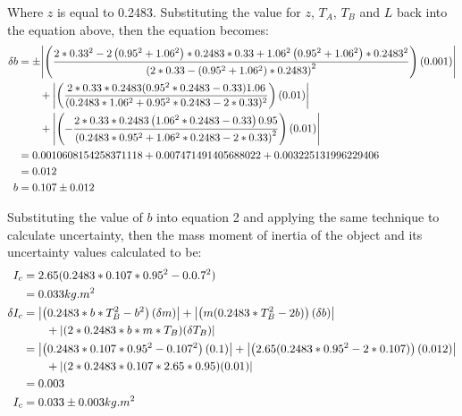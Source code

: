 Where $z$ is equal to 0.2483. Substituting the value for $z$, $T_A$, $T_B$ and $L$ back into the equation above, then the equation becomes: \\
\begin{align}
\delta b &= \pm \abs{\left(\dfrac{2*0.33^2-2\left(0.95^2+1.06^2\right)*0.2483*0.33+1.06^2\left(0.95^2+1.06^2\right)*0.2483^2}{\left(2*0.33-\left(0.95^2+1.06^2\right)*0.2483\right)^2}\right)(0.001)} \notag \\
&\qquad + \abs{\left(\dfrac{2*0.33*0.2483(0.95^2*0.2483-0.33)1.06}{(0.2483*1.06^2+0.95^2*0.2483-2*0.33)^2}\right)(0.01)} \notag \\ 
&\qquad + \abs{\left(-\dfrac{2*0.33*0.2483\left(1.06^2*0.2483-0.33\right)0.95}{\left(0.2483*0.95^2+1.06^2*0.2483-2*0.33\right)^2}\right)(0.01)} \notag \\
&=  0.0010608154258371118 + 0.007471491405688022 + 0.003225131996229406 \notag \\
&= 0.012 \notag \\
b &= 0.107 \pm 0.012 \notag
\end{align}

Substituting the value of $b$ into equation 2 and applying the same technique to calculate uncertainty, then the mass moment of inertia of the object and its uncertainty values calculated to be:
\begin{align}
I_c &= 2.65(0.2483 * 0.107 * 0.95^2 - 0.0.7^2) \notag \\
&= 0.033 kg.m^2 \notag \\
\delta I_c &= \abs{\left(0.2483*b*T_B^2-b^2\right)(\delta m)} + \abs{\left(m(0.2483*T_B^2-2b)\right)(\delta b)} \notag \\
&\qquad + \abs{(2*0.2483*b*m*T_B)(\delta T_B)} \notag \\
&= \abs{\left(0.2483*0.107*0.95^2-0.107^2\right)(0.1)} + \abs{\left(2.65(0.2483*0.95^2-2*0.107)\right)(0.012)} \notag \\
&\qquad + \abs{(2*0.2483*0.107*2.65*0.95)(0.01)} \notag \\
&= 0.003 \notag \\
I_c &= 0.033 \pm 0.003 kg.m^2 \notag 
\end{align}
